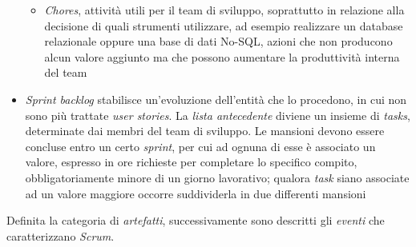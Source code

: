 \documentclass{article}
\begin{document}
\begin{itemize}[label={-}]
\begin{itemize}[label={-}]
                                                                                                                                                                                                                                                                                \item \textit{Chores}, attività utili per il team di sviluppo, soprattutto in relazione alla decisione di quali strumenti utilizzare, ad esempio realizzare un database relazionale oppure una base di dati No-SQL, azioni che non producono alcun valore aggiunto ma che possono aumentare la produttività interna del team 
                                                                                                                                                                                                                                                                            \end{itemize}
    \item \textit{Sprint backlog} stabilisce un'evoluzione dell'entità che lo procedono, in cui non sono più trattate \textit{user stories}. La \textit{lista antecedente} diviene un insieme di \textit{tasks}, determinate dai membri del team di sviluppo. Le mansioni devono essere concluse entro un certo \textit{sprint}, per cui ad ognuna di esse è associato un valore, espresso in ore richieste per completare lo specifico compito, obbligatoriamente minore di un giorno lavorativo; qualora \textit{task} siano associate ad un valore maggiore occorre suddividerla in due differenti mansioni 
\end{itemize}
Definita la categoria di \textit{artefatti}, successivamente sono descritti gli \textit{eventi} che caratterizzano \textit{Scrum}.
\end{document}
